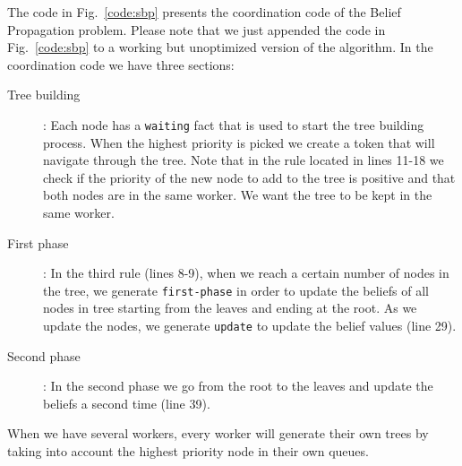 The code in Fig.~\ref{code:sbp} presents the coordination code of the Belief Propagation problem.
Please note that we just appended the code in Fig.~\ref{code:sbp} to a working but
unoptimized version of the algorithm.
In the coordination code we have three sections:
\begin{description}
   \item[Tree building]: Each node has a \texttt{waiting} fact that is used to start the tree building process. When the highest priority is picked we create a token that will navigate through the tree. Note that in the rule located in lines 11-18 we check if the priority of the new node to add to the tree is positive and that both nodes are in the same worker. We want the tree to be kept in the same worker.
   \item[First phase]: In the third rule (lines 8-9), when we reach a certain number of nodes in the tree, we generate \texttt{first-phase} in order to update the beliefs of all nodes in tree starting from the leaves and ending at the root. As we update the nodes, we generate \texttt{update} to update the belief values (line 29).
   \item[Second phase]: In the second phase we go from the root to the leaves and update the beliefs a second time (line 39).
\end{description}

When we have several workers, every worker will generate their own trees by taking into account the highest priority node in their own queues.

